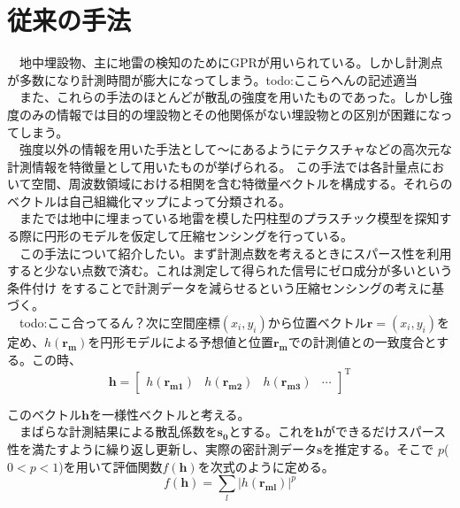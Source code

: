 \documentclass[12pt,a4paper]{jsreport}
\begin{document}
\section{従来の手法}
　地中埋設物、主に地雷の検知のためにGPRが用いられている。しかし計測点が多数になり計測時間が膨大になってしまう。todo:ここらへんの記述適当
\\　また、これらの手法のほとんどが散乱の強度を用いたものであった。しかし強度のみの情報では目的の埋設物とその他関係がない埋設物との区別が困難になってしまう。
\\　強度以外の情報を用いた手法として\cite{hirose1}～\cite{hirose3}にあるようにテクスチャなどの高次元な計測情報を特徴量として用いたものが挙げられる。
この手法では各計量点において空間、周波数領域における相関を含む特徴量ベクトルを構成する。それらのベクトルは自己組織化マップによって分類される。
\\　また\cite{imai}では地中に埋まっている地雷を模した円柱型のプラスチック模型を探知する際に円形のモデルを仮定して圧縮センシングを行っている。
\\　この手法について紹介したい。まず計測点数を考えるときにスパース性を利用すると少ない点数で済む。これは測定して得られた信号にゼロ成分が多いという条件付け
をすることで計測データを減らせるという圧縮センシングの考えに基づく。
\\　todo:ここ合ってるん？次に空間座標$(x_{i},y_{i})$から位置ベクトル$\bm{r}=(x_{i},y_{i})$を定め、$h(\bm{r_{m}})$を円形モデルによる予想値と位置$\bm{r_{m}}$での計測値との一致度合とする。この時、
\begin{equation}
  \bm{h} =
      \left[
      \begin{array}{rrrr}
      h(\bm{r_{m1}})&h(\bm{r_{m2}})&h(\bm{r_{m3}})&\cdots
      \end{array}
      \right]^\mathrm{T}
      \label{mbh}
  \end{equation}


このベクトル$\bm{h}$を一様性ベクトルと考える。
\\　まばらな計測結果による散乱係数を$\bm{s_{0}}$とする。これを$\bm{h}$ができるだけスパース性を満たすように繰り返し更新し、実際の密計測データ$\bm{s}$を推定する。そこで
$p$($0<p<1$)を用いて評価関数$f(\bm{h})$を次式のように定める。
\begin{equation}
  f(\bm{h})=\sum_{l}|h(\bm{r_{ml}})|^{p}
  \end{equation}
\end{document}
